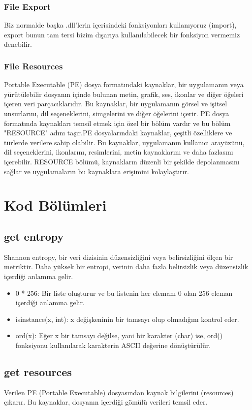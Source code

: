 \documentclass{article}
\begin{document}
\subsubsection{File Export}
Biz normalde başka .dll'lerin içerisindeki fonksiyonları kullanıyoruz (import), export bunun tam tersi bizim dışarıya kullanılabilecek bir fonksiyon vermemiz denebilir.
\subsubsection{File Resources}
Portable Executable (PE) dosya formatındaki kaynaklar, bir uygulamanın veya yürütülebilir dosyanın içinde bulunan metin, grafik, ses, ikonlar ve diğer öğeleri içeren veri parçacıklarıdır. Bu kaynaklar, bir uygulamanın görsel ve işitsel unsurlarını, dil seçeneklerini, simgelerini ve diğer öğelerini içerir. PE dosya formatında kaynakları temsil etmek için özel bir bölüm vardır ve bu bölüm "RESOURCE" adını taşır.PE dosyalarındaki kaynaklar, çeşitli özelliklere ve türlerde verilere sahip olabilir. Bu kaynaklar, uygulamanın kullanıcı arayüzünü, dil seçeneklerini, ikonlarını, resimlerini, metin kaynaklarını ve daha fazlasını içerebilir. RESOURCE bölümü, kaynakların düzenli bir şekilde depolanmasını sağlar ve uygulamaların bu kaynaklara erişimini kolaylaştırır.
\cite{PE2}

\section{Kod Bölümleri}
\subsection{get entropy}
Shannon entropy, bir veri dizisinin düzensizliğini veya belirsizliğini ölçen bir metriktir. Daha yüksek bir entropi, verinin daha fazla belirsizlik veya düzensizlik içerdiği anlamına gelir.
\begin{itemize}
    \item 0 * 256:
    Bir liste oluşturur ve bu listenin her elemanı 0 olan 256 eleman içerdiği anlamına gelir. 
    \item isinstance(x, int): x değişkeninin bir tamsayı olup olmadığını kontrol eder. 
    \item ord(x): Eğer x bir tamsayı değilse, yani bir karakter (char) ise, ord() fonksiyonu kullanılarak karakterin ASCII değerine dönüştürülür. 
\end{itemize}
\subsection{get resources}
Verilen PE (Portable Executable) dosyasından kaynak bilgilerini (resources) çıkarır. Bu kaynaklar, dosyanın içerdiği gömülü verileri temsil eder.
\end{document}
